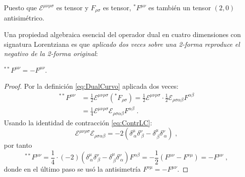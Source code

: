             Puesto que $\mathcal{E}^{\mu\nu\rho\sigma}$ es tensor y $F_{\rho\sigma}$ es tensor, ${}^{*}F^{\mu\nu}$ es también un tensor $(2,0)$ antisimétrico.

            Una propiedad algebraica esencial del operador dual en cuatro dimensiones con signatura Lorentziana es que \emph{aplicado dos veces sobre una 2-forma reproduce el negativo de la 2-forma original}:

            \begin{myteo}
                \label{teo:DobleDual}
                ${}^{**}F^{\mu\nu} = -F^{\mu\nu}$.
            \end{myteo}

            \begin{proof}
                Por la definición \eqref{eq:DualCurvo} aplicada dos veces:
                \begin{align*}
                    {}^{**}F^{\mu\nu}
                    &= \frac{1}{2}\mathcal{E}^{\mu\nu\rho\sigma}
                    \left({}^{*}F_{\rho\sigma}\right)
                    = \frac{1}{2}\mathcal{E}^{\mu\nu\rho\sigma}
                    \cdot\frac{1}{2}\mathcal{E}_{\rho\sigma\alpha\beta}F^{\alpha\beta}\\
                    &= \frac{1}{4}\mathcal{E}^{\mu\nu\rho\sigma}
                    \mathcal{E}_{\rho\sigma\alpha\beta}F^{\alpha\beta}\;.
                \end{align*}
                Usando la identidad de contracción \eqref{eq:ContrLC}:
                \begin{equation*}
                    \mathcal{E}^{\mu\nu\rho\sigma}\mathcal{E}_{\rho\sigma\alpha\beta}
                    = -2\!\left(\delta^{\mu}_{\ \alpha}\delta^{\nu}_{\ \beta}
                            -\delta^{\mu}_{\ \beta}\delta^{\nu}_{\ \alpha}\right)\;,
                \end{equation*}
                por tanto
                \begin{equation*}
                    {}^{**}F^{\mu\nu}
                    = \frac{1}{4}\cdot(-2)
                    \!\left(\delta^{\mu}_{\ \alpha}\delta^{\nu}_{\ \beta}
                            -\delta^{\mu}_{\ \beta}\delta^{\nu}_{\ \alpha}\right)
                    F^{\alpha\beta}
                    = -\frac{1}{2}(F^{\mu\nu}-F^{\nu\mu})
                    = -F^{\mu\nu}\;,
                \end{equation*}
                donde en el último paso se usó la antisimetría $F^{\nu\mu}=-F^{\mu\nu}$.
            \end{proof}

